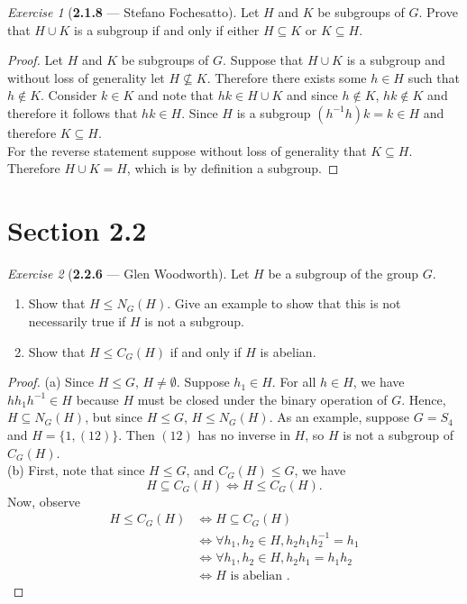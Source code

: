 \documentclass[12pt]{amsart}
\theoremstyle{remark}
\newtheorem*{exercise}{Exercise}%
\theoremstyle{mycomment}
\begin{document}
\begin{exercise}[\textbf{2.1.8} --- Stefano Fochesatto] Let $H$ and $K$ be subgroups of $G$. Prove that 
  $H \cup K$ is a subgroup if and only if either $H \subseteq K$ or $K \subseteq H$.
    \begin{proof} Let $H$ and $K$ be subgroups of $G$. Suppose that $H \cup K$ is a subgroup and without loss of generality let $H \not\subseteq K$. 
      Therefore there exists some $h \in H$ such that $h \not\in K$.
      Consider $k \in K$ and note that $hk \in H \cup K$ and since $h \not\in K$, $hk \not\in K$ and therefore it follows that 
      $hk \in H$. Since $H$ is a subgroup $(h^{-1}h)k = k \in H$ and therefore $K \subseteq H$.\\
      For the reverse statement suppose without loss of generality that $K \subseteq H$. Therefore $H\cup K = H$, which is by definition a subgroup. 
    \end{proof}
\end{exercise}
\vspace{.15in}








\section*{\textbf{Section 2.2}}


\begin{exercise}[\textbf{2.2.6} --- Glen Woodworth] Let $H$ be a subgroup of the group $G$. 
  \begin{enumerate}
  \item Show that $H\le N_G(H)$. Give an example to show that this is not necessarily true if $H$ is not a subgroup.
  \item Show that $H\le C_G(H)$ if and only if $H$ is abelian. 
  \end{enumerate}
  \begin{proof}
  (a) Since $H\le G$, $H\ne\emptyset$. Suppose $h_1\in H$. For all $h\in H$, we have $hh_1h^{-1}\in H$ because $H$ must be closed under the binary operation of $G$. Hence, $H\subseteq N_G(H)$, but since $H\le G$, $H\le  N_G(H)$. As an example, suppose $G=S_4$ and $H=\{1,(12)\}$. Then $(12)$ has no inverse in $H$, so $H$ is not a subgroup of $C_G(H)$.\\
  (b) First, note that since $H\le G$, and $C_G(H)\le G$, we have \[H\subseteq C_G(H)\iff H\le C_G(H).\] Now, observe
  \begin{align*}
  H\le C_G(H)&\iff H\subseteq C_G(H)\\
  &\iff  \forall h_1,h_2\in H, h_2h_1h_2^{-1}=h_1\\
  &\iff  \forall h_1,h_2\in H, h_2h_1=h_1h_2\\
  &\iff H \text{ is abelian }.
  \end{align*}
  \end{proof} 
  \end{exercise}
\vspace{.15in}
\end{document}
